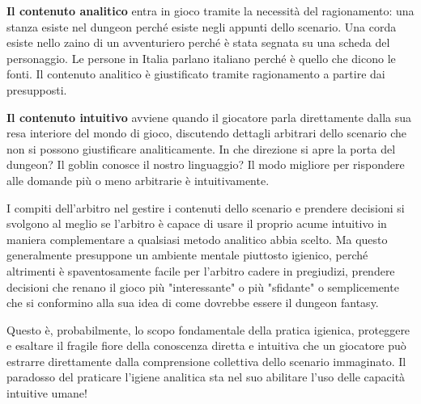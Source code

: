 \textbf{Il contenuto analitico} entra in gioco tramite la necessità del ragionamento: una stanza esiste nel dungeon perché esiste negli appunti dello scenario. Una corda esiste nello zaino di un avventuriero perché è stata segnata su una scheda del personaggio. Le persone in Italia parlano italiano perché è quello che dicono le fonti. Il contenuto analitico è giustificato tramite ragionamento a partire dai presupposti.

\textbf{Il contenuto intuitivo} avviene quando il giocatore parla direttamente dalla sua resa interiore del mondo di gioco, discutendo dettagli arbitrari dello scenario che non si possono giustificare analiticamente. In che direzione si apre la porta del dungeon? Il goblin conosce il nostro linguaggio? Il modo migliore per rispondere alle domande più o meno arbitrarie è intuitivamente.

I compiti dell'arbitro nel gestire i contenuti dello scenario e prendere decisioni si svolgono al meglio se l'arbitro è capace di usare il proprio acume intuitivo in maniera complementare a qualsiasi metodo analitico abbia scelto. Ma questo generalmente presuppone un ambiente mentale piuttosto igienico, perché altrimenti è spaventosamente facile per l'arbitro cadere in pregiudizi, prendere decisioni che renano il gioco più "interessante"  o più "sfidante" o semplicemente che si conformino alla sua idea di come dovrebbe essere il dungeon fantasy.

Questo è, probabilmente, lo scopo fondamentale della pratica igienica, proteggere e esaltare il fragile fiore della conoscenza diretta e intuitiva che un giocatore può estrarre direttamente dalla comprensione collettiva dello scenario immaginato. Il paradosso del praticare l'igiene analitica sta nel suo abilitare l'uso delle capacità intuitive umane!